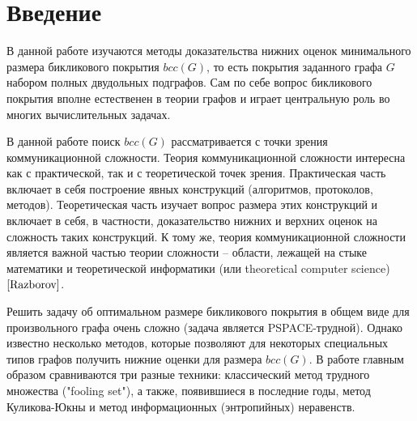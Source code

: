 \documentclass[a4paper]{article}
\begin{document}
\newpage

\tableofcontents

\newpage
 
\newpage

\setcounter{mclaim}{0}
\setcounter{mlemma}{0}
\setcounter{mtheorem}{0}
\setcounter{section}{0}
\section*{Введение}

В данной работе изучаются методы доказательства нижних оценок минимального размера бикликового покрытия $bcc(G)$,
то есть покрытия заданного графа $G$ набором полных двудольных подграфов. Сам по себе вопрос бикликового 
покрытия вполне естественен в теории графов и играет центральную роль во многих вычислительных задачах. 

В данной работе поиск $bcc(G)$ рассматривается с точки зрения коммуникационной сложности. 
Теория коммуникационной сложности интересна как с практической, так и с теоретической точек зрения. 
Практическая часть включает в себя построение явных конструкций (алгоритмов, протоколов, методов). 
Теоретическая часть изучает вопрос размера этих конструкций и включает в себя, в частности, доказательство 
нижних и верхних оценок на сложность таких конструкций. К тому же, теория коммуникационной сложности
является важной частью теории сложности -- области, лежащей на стыке математики и теоретической информатики 
(или theoretical computer science) $\cite{Razborov}$. 

Решить задачу об оптимальном размере бикликового покрытия в общем виде для произвольного графа очень 
сложно (задача является PSPACE-трудной). Однако известно несколько методов, 
которые позволяют для некоторых специальных типов графов получить нижние оценки для размера $bcc(G)$.
В работе главным образом сравниваются три разные техники: классический метод трудного множества ("fooling set"), а также,
появившиеся в последние годы, метод Куликова-Юкны и метод информационных (энтропийных) неравенств.
\end{document}
